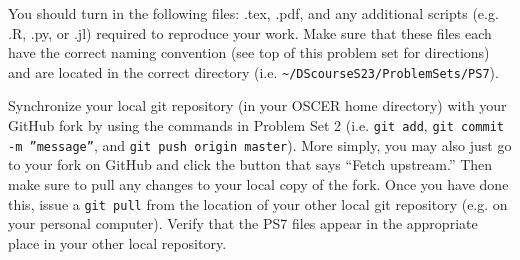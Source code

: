 \documentclass[12pt,english]{exam}
\begin{document}
\begin{questions}
\question You should turn in the following files: .tex, .pdf, and any additional scripts (e.g. .R, .py, or .jl) required to reproduce your work.  Make sure that these files each have the correct naming convention (see top of this problem set for directions) and are located in the correct directory (i.e. \texttt{\textasciitilde/DScourseS23/ProblemSets/PS7}).

\question Synchronize your local git repository (in your OSCER home directory) with your GitHub fork by using the commands in Problem Set 2 (i.e. \texttt{git add}, \texttt{git commit -m ''message''}, and \texttt{git push origin master}). More simply, you may also just go to your fork on GitHub and click the button that says ``Fetch upstream.'' Then make sure to pull any changes to your local copy of the fork. Once you have done this, issue a \texttt{git pull} from the location of your other local git repository (e.g. on your personal computer). Verify that the PS7 files appear in the appropriate place in your other local repository.

\end{questions}
\end{document}
